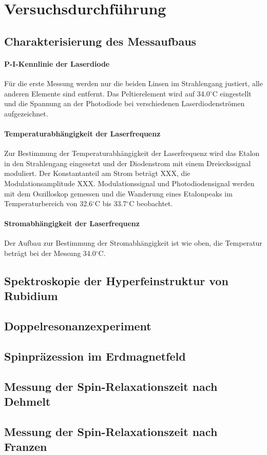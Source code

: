 \section{Versuchsdurchführung}


\subsection{Charakterisierung des Messaufbaus}

\paragraph{P-I-Kennlinie der Laserdiode}
Für die erste Messung werden nur die beiden Linsen im Strahlengang justiert, alle anderen Elemente sind entfernt. 
Das Peltierelement wird auf 34.0$^\circ$C eingestellt und die Spannung an der
Photodiode bei verschiedenen Laserdiodenströmen aufgezeichnet.

\paragraph{Temperaturabhängigkeit der Laserfrequenz}
Zur Bestimmung der Temperaturabhängigkeit der
Laserfrequenz wird das Etalon in den Strahlengang eingesetzt und der Diodenstrom mit einem Dreieckssignal
moduliert. Der Konstantanteil am Strom beträgt XXX, die Modulationsamplitude XXX.
Modulationssignal und Photodiodensignal werden mit dem Oszilloskop gemessen und die Wanderung eines Etalonpeaks
im Temperaturbereich von 32.6$^\circ$C bis 33.7$^\circ$C beobachtet.

\paragraph{Stromabhängigkeit der Laserfrequenz} Der Aufbau zur Bestimmung der Stromabhängigkeit ist wie oben,
die Temperatur beträgt bei der Messung 34.0$^\circ$C.


\subsection{Spektroskopie der Hyperfeinstruktur von Rubidium}


\subsection{Doppelresonanzexperiment}


\subsection{Spinpräzession im Erdmagnetfeld}


\subsection{Messung der Spin-Relaxationszeit nach Dehmelt}


\subsection{Messung der Spin-Relaxationszeit nach Franzen}